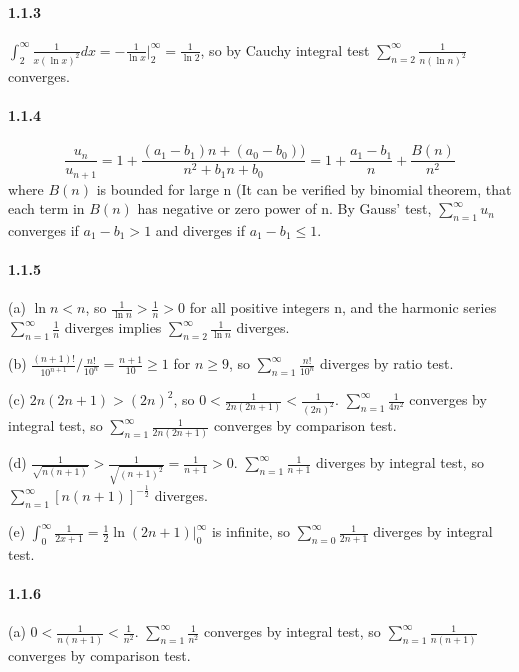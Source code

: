 \documentclass[a4paper]{article}
\begin{document}

\paragraph{1.1.3}
$\int_2^\infty \frac{1}{x(\ln x)^2}dx=-\frac{1}{\ln x}\bigr |_2^\infty=\frac{1}{\ln 2}$, so by Cauchy integral test $\sum_{n=2}^\infty \frac{1}{n(\ln n)^2}$ converges.

\paragraph{1.1.4}
\[\frac{u_n}{u_{n+1}}=1+\frac{(a_1-b_1)n+(a_0-b_0))}{n^2+b_1n+b_0}=1+\frac{a_1-b_1}{n}+\frac{B(n)}{n^2}\] where $B(n)$ is bounded for large n (It can be verified by binomial theorem, that each term in $B(n)$ has negative or zero power of n. By Gauss' test, $\sum_{n=1}^\infty u_n$ converges if $a_1-b_1>1$ and diverges if $a_1-b_1\leq 1$. 

\paragraph{1.1.5}
(a) $\ln n<n$, so $\frac{1}{\ln n}>\frac{1}{n}>0$ for all positive integers n, and the harmonic series $\sum_{n=1}^\infty \frac{1}{n}$ diverges implies $\sum_{n=2}^\infty \frac{1}{\ln n}$ diverges.
\medskip

(b) $\frac{(n+1)!}{10^{n+1}}/\frac{n!}{10^n}=\frac{n+1}{10}\geq 1$ for $n\geq 9$, so $\sum_{n=1}^\infty \frac{n!}{10^n}$ diverges by ratio test.
\medskip

(c) $2n(2n+1)>(2n)^2$, so $0<\frac{1}{2n(2n+1)}<\frac{1}{(2n)^2}$. 
$\sum_{n=1}^\infty \frac{1}{4n^2}$ converges by integral test, so $\sum_{n=1}^\infty \frac{1}{2n(2n+1)}$ converges by comparison test.
\medskip

(d) $\frac{1}{\sqrt{n(n+1)}}>\frac{1}{\sqrt{(n+1)^2}}=\frac{1}{n+1}>0$. $\sum_{n=1}^\infty \frac{1}{n+1}$ diverges by integral test, so $\sum_{n=1}^\infty[n(n+1)]^{-\frac{1}{2}}$ diverges.
\medskip

(e) $\int_0^\infty \frac{1}{2x+1}=\frac{1}{2}\ln (2n+1)\bigr |_0^\infty$ is infinite, so $\sum_{n=0}^\infty \frac{1}{2n+1}$ diverges by integral test.

\paragraph{1.1.6}
(a) $0<\frac{1}{n(n+1)}<\frac{1}{n^2}$. $\sum_{n=1}^\infty\frac{1}{n^2}$ converges by integral test, so $\sum_{n=1}^\infty \frac{1}{n(n+1)}$ converges by comparison test. 
\medskip
\end{document}
